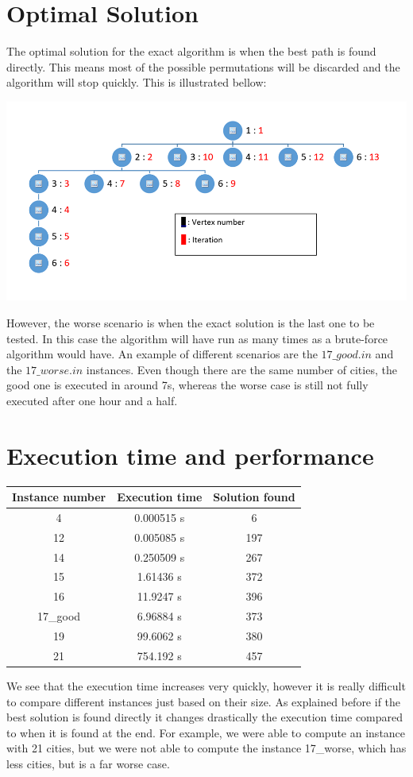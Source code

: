 \documentclass[a4paper, 12pt]{report}
\begin{document}
		\section{Optimal Solution}
		The optimal solution for the exact algorithm is when the best path is found directly. This means most of the possible permutations will be discarded and the algorithm will stop quickly. This is illustrated bellow:
		\begin{center}
			\includegraphics[width=500pt]{backtracking.png}
		\end{center}
		However, the worse scenario is when the exact solution is the last one to be tested. In this case the algorithm will have run as many times as a brute-force algorithm would have. An example of different scenarios are the $17\_good.in$ and the $17\_worse.in$ instances. Even though there are the same number of cities, the good one is executed in around 7s, whereas the worse case is still not fully executed after one hour and a half.
		\section{Execution time and performance}
		\begin{center}
			\begin{tabular}{|c|c|c|}
				\hline
				Instance number&Execution time&Solution found\\
				\hline
				4 & 0.000515 s & 6\\
				12 & 0.005085 s & 197\\
				14 & 0.250509 s & 267\\
				15 & 1.61436 s & 372\\
				16 & 11.9247 s & 396\\
				17\_good & 6.96884 s & 373\\
				19 & 99.6062 s & 380\\
				21 & 754.192 s & 457\\
				\hline
			\end{tabular}
		\end{center}
		We see that the execution time increases very quickly, however it is really difficult to compare different instances just based on their size. As explained before if the best solution is found directly it changes drastically the execution time compared to when it is found at the end. For example, we were able to compute an instance with 21 cities, but we were not able to compute the instance 17\_worse, which has less cities, but is a far worse case. 
	
\end{document}

